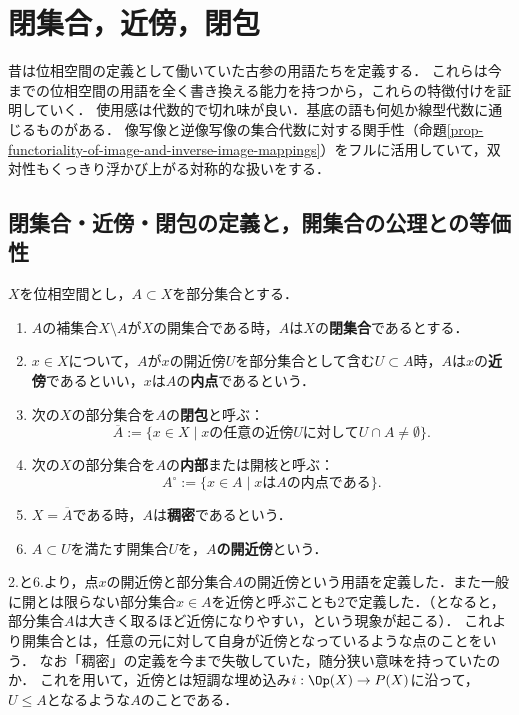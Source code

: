 \documentclass[uplatex,dvipdfmx]{jsreport}
\begin{document}
\section{閉集合，近傍，閉包}\label{sec-duality-of-opens-and-closed}

\begin{tcolorbox}[colframe=ForestGreen, colback=ForestGreen!10!white, breakable]
    昔は位相空間の定義として働いていた古参の用語たちを定義する．
    これらは今までの位相空間の用語を全く書き換える能力を持つから，これらの特徴付けを証明していく．
    使用感は代数的で切れ味が良い．基底の語も何処か線型代数に通じるものがある．
    像写像と逆像写像の集合代数に対する関手性（命題\ref{prop-functoriality-of-image-and-inverse-image-mappings}）をフルに活用していて，双対性もくっきり浮かび上がる対称的な扱いをする．
\end{tcolorbox}

\subsection{閉集合・近傍・閉包の定義と，開集合の公理との等価性}

\begin{definition}\label{def-closure}
    $X$を位相空間とし，$A\subset X$を部分集合とする．
    \begin{enumerate}
        \item $A$の補集合$X\setminus A$が$X$の開集合である時，$A$は$X$の\textbf{閉集合}であるとする．
        \item $x\in X$について，$A$が$x$の開近傍$U$を部分集合として含む$U\subset A$時，$A$は$x$の\textbf{近傍}であるといい，$x$は$A$の\textbf{内点}であるという．
        \item 次の$X$の部分集合を$A$の\textbf{閉包}と呼ぶ：\[ \overline{A}:=\{x\in X\mid xの任意の近傍Uに対してU\cap A\ne\emptyset\}. \]
        \item 次の$X$の部分集合を$A$の\textbf{内部}または開核と呼ぶ：\[A^\circ:=\{x\in A\mid xはAの内点である\}.\]
        \item $X=\overline{A}$である時，$A$は\textbf{稠密}であるという．
        \item $A\subset U$を満たす開集合$U$を，\textbf{$A$の開近傍}という．
    \end{enumerate}
\end{definition}
\begin{remark}
    2.と6.より，点$x$の開近傍と部分集合$A$の開近傍という用語を定義した．また一般に開とは限らない部分集合$x\in A$を近傍と呼ぶことも2で定義した．（となると，部分集合$A$は大きく取るほど近傍になりやすい，という現象が起こる）．
    これより開集合とは，任意の元に対して自身が近傍となっているような点のことをいう．
    なお「稠密」の定義を今まで失敬していた，随分狭い意味を持っていたのか．
    これを用いて，近傍とは短調な埋め込み$i:\Op(X)\to P(X)$に沿って，$U\le A$となるような$A$のことである．
\end{remark}
\end{document}
